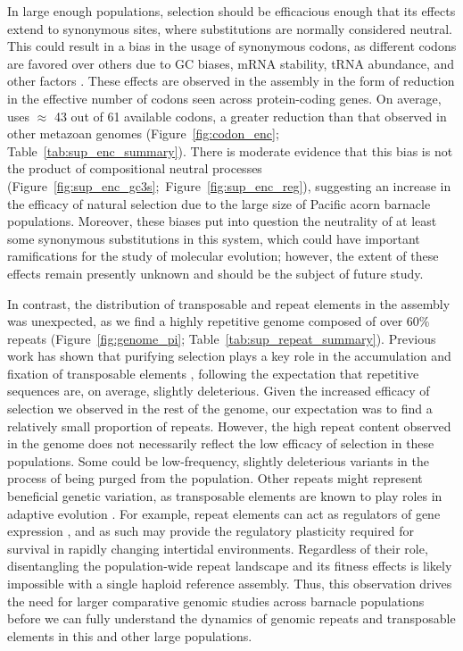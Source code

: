 In large enough populations, selection should be efficacious enough that its effects
extend to synonymous sites, where substitutions are normally considered neutral.
This could result in a bias in the usage of synonymous codons, as different codons are
favored over others due to GC biases, mRNA stability, tRNA abundance, and other factors
\citep{galtier_codon_2018,presnyak_codon_2015}.
These effects are observed in the \bgla{} assembly in the form of reduction in the
effective number of codons seen across protein-coding genes.
On average, \bgla{} uses $\approx$ 43 out of 61 available codons, a greater reduction than
that observed in other metazoan genomes (Figure~\ref{fig:codon_enc};
Table~\ref{tab:sup_enc_summary}).
There is moderate evidence that this bias is not the product of compositional neutral
processes (Figure~\ref{fig:sup_enc_gc3s};~Figure~\ref{fig:sup_enc_reg}), suggesting an
increase in the efficacy of natural selection due to the large size of Pacific acorn
barnacle populations.
Moreover, these biases put into question the neutrality of at least some synonymous
substitutions in this system, which could have important ramifications for the study of
molecular evolution; however, the extent of these effects remain presently unknown and
should be the subject of future study.
\vspace{0.1cm}

In contrast, the distribution of transposable and repeat elements in the
\bgla{} assembly was unexpected, as we find a highly repetitive genome
composed of over 60\% repeats (Figure~\ref{fig:genome_pi};
Table~\ref{tab:sup_repeat_summary}).
Previous work has shown that purifying selection plays a key role in the accumulation
and fixation of transposable elements \citep{merel_relaxed_2025,langmuller_genomic_2023,
bourque_ten_2018}, following the expectation that repetitive sequences are, on average,
slightly deleterious.
Given the increased efficacy of selection we observed in the rest of the genome,
our expectation was to find a relatively small proportion of repeats.
However, the high repeat content observed in the genome does not necessarily
reflect the low efficacy of selection in these populations.
Some could be low-frequency, slightly deleterious variants in the process of being purged
from the population.
Other repeats might represent beneficial genetic variation, as transposable elements are
known to play roles in adaptive evolution \citep{schrader_impact_2019}.
For example, repeat elements can act as regulators of gene expression
\citep{trizzino_transposable_2017,rech_population-scale_2022}, and as such may provide
the regulatory plasticity required for survival in rapidly changing
intertidal environments.
Regardless of their role, disentangling the population-wide repeat landscape and its
fitness effects is likely impossible with a single haploid reference assembly.
Thus, this observation drives the need for larger comparative genomic studies across
barnacle populations before we can fully understand the dynamics of genomic repeats
and transposable elements in this and other large populations.

